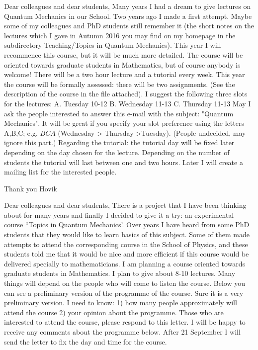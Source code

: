 

                 Dear colleagues and dear students,
    Many years  I had a dream to  give lectures  on Quantum Mechanics
in our School.  Two years ago I made a first attempt.
 Maybe some of my colleagues and  PhD students still remember it
(the short notes on the lectures which I gave in Autumn 2016 you may 
find on my  homepage in the subdirectory Teaching/Topics in 
Quantum Mechanics).
    This year I will recommence this course, but 
it will be much more detailed.  
The course will be oriented towards graduate students in
Mathematics, but of course anybody is welcome!
    There will be a two hour lecture
and a tutorial every week. This year the course will be formally assessed: 
there will be two assignments. (See the description of the course
in the file attached).
    I suggest the following  three slots for the lectures:
         A.  Tuesday            10-12
         B.   Wednesday         11-13
         C.   Thursday          11-13 
    May I ask the people interested 
to answer this e-mail  with the subject: "Quantum Mechanics".
It will be great if you specify your slot preference using  
the letters  A,B,C; e.g. $BCA$ (Wednesday > Thursday >Tuesday).
(People  undecided, may ignore this part.)
    Regarding the tutorial: the tutorial day will be fixed later
depending on the day chosen for the lecture.
Depending on the number of students the tutorial will last 
between one and two hours.
    Later I will create a mailing list for
the interested  people.
    
                   Thank you Hovik

   


\bye   



          Dear colleagues and dear students,
    There is a project that I have been thinking about for many years and
finally I decided to give it a try:
an experimental course ``Topics in Quantum Mechanics'.
    Over years I have heard from some PhD students that they would like to
learn basics of this subject. Some of them made attempts to attend the
corresponding course in the School of Physics, and these students told
me that it would be nice and more efficient if this course would be
delivered specially to mathematicians.
    I am planning a course oriented towards graduate students in
Mathematics. I plan to give about 8-10 lectures. Many things will depend
on the people who will come to listen the course.
    Below you can see a preliminary version of the programme of the course.
Sure it is a very preliminary version.
 	I need to know:
1) how many people approximately  will attend the course
2) your opinion about the programme.
    Those who are interested to attend the course, please respond to this
letter. I will be happy to receive any comments about the programme below.
 	After 21 September I will send the letter to fix the day
and time for the course.

